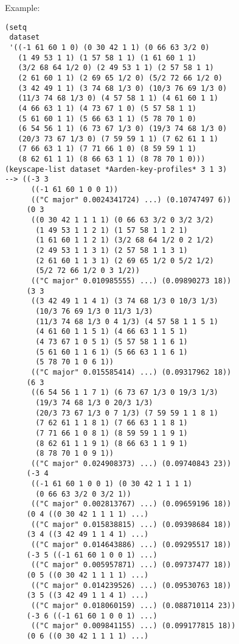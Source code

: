 \vspace{0.5cm}
\noindent Example:
\begin{verbatim}
(setq
 dataset
 '((-1 61 60 1 0) (0 30 42 1 1) (0 66 63 3/2 0)
   (1 49 53 1 1) (1 57 58 1 1) (1 61 60 1 1)
   (3/2 68 64 1/2 0) (2 49 53 1 1) (2 57 58 1 1)
   (2 61 60 1 1) (2 69 65 1/2 0) (5/2 72 66 1/2 0)
   (3 42 49 1 1) (3 74 68 1/3 0) (10/3 76 69 1/3 0)
   (11/3 74 68 1/3 0) (4 57 58 1 1) (4 61 60 1 1)
   (4 66 63 1 1) (4 73 67 1 0) (5 57 58 1 1)
   (5 61 60 1 1) (5 66 63 1 1) (5 78 70 1 0)
   (6 54 56 1 1) (6 73 67 1/3 0) (19/3 74 68 1/3 0)
   (20/3 73 67 1/3 0) (7 59 59 1 1) (7 62 61 1 1)
   (7 66 63 1 1) (7 71 66 1 0) (8 59 59 1 1)
   (8 62 61 1 1) (8 66 63 1 1) (8 78 70 1 0)))
(keyscape-list dataset *Aarden-key-profiles* 3 1 3)
--> ((-3 3
      ((-1 61 60 1 0 0 1))
      (("C major" 0.0024341724) ...) (0.10747497 6))
     (0 3
      ((0 30 42 1 1 1 1) (0 66 63 3/2 0 3/2 3/2)
       (1 49 53 1 1 2 1) (1 57 58 1 1 2 1)
       (1 61 60 1 1 2 1) (3/2 68 64 1/2 0 2 1/2)
       (2 49 53 1 1 3 1) (2 57 58 1 1 3 1)
       (2 61 60 1 1 3 1) (2 69 65 1/2 0 5/2 1/2)
       (5/2 72 66 1/2 0 3 1/2))
      (("C major" 0.010985555) ...) (0.09890273 18))
     (3 3
      ((3 42 49 1 1 4 1) (3 74 68 1/3 0 10/3 1/3)
       (10/3 76 69 1/3 0 11/3 1/3)
       (11/3 74 68 1/3 0 4 1/3) (4 57 58 1 1 5 1)
       (4 61 60 1 1 5 1) (4 66 63 1 1 5 1)
       (4 73 67 1 0 5 1) (5 57 58 1 1 6 1)
       (5 61 60 1 1 6 1) (5 66 63 1 1 6 1)
       (5 78 70 1 0 6 1))
      (("C major" 0.015585414) ...) (0.09317962 18))
     (6 3
      ((6 54 56 1 1 7 1) (6 73 67 1/3 0 19/3 1/3)
       (19/3 74 68 1/3 0 20/3 1/3)
       (20/3 73 67 1/3 0 7 1/3) (7 59 59 1 1 8 1)
       (7 62 61 1 1 8 1) (7 66 63 1 1 8 1)
       (7 71 66 1 0 8 1) (8 59 59 1 1 9 1)
       (8 62 61 1 1 9 1) (8 66 63 1 1 9 1)
       (8 78 70 1 0 9 1))
      (("C major" 0.024908373) ...) (0.09740843 23))
     (-3 4
      ((-1 61 60 1 0 0 1) (0 30 42 1 1 1 1)
       (0 66 63 3/2 0 3/2 1))
      (("C major" 0.002813767) ...) (0.09659196 18))
     (0 4 ((0 30 42 1 1 1 1) ...)
      (("C major" 0.015838815) ...) (0.09398684 18))
     (3 4 ((3 42 49 1 1 4 1) ...)
      (("C major" 0.014643886) ...) (0.09295517 18))
     (-3 5 ((-1 61 60 1 0 0 1) ...)
      (("C major" 0.005957871) ...) (0.09737477 18))
     (0 5 ((0 30 42 1 1 1 1) ...)
      (("C major" 0.014239526) ...) (0.09530763 18))
     (3 5 ((3 42 49 1 1 4 1) ...) 
      (("C major" 0.018060159) ...) (0.088710114 23))
     (-3 6 ((-1 61 60 1 0 0 1) ...)
      (("C major" 0.009841155) ...) (0.099177815 18))
     (0 6 ((0 30 42 1 1 1 1) ...)

\end{verbatim}
